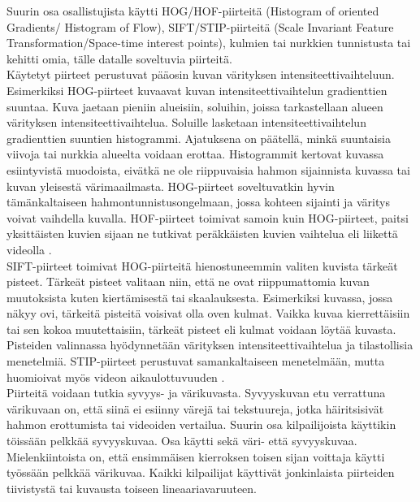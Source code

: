 Suurin osa osallistujista käytti HOG/HOF-piirteitä (Histogram of oriented Gradients/ Histogram of Flow), SIFT/STIP-piirteitä 
(Scale Invariant Feature Transformation/Space-time interest points), 
kulmien tai nurkkien tunnistusta tai kehitti omia, tälle datalle soveltuvia piirteitä.\citep {6239178}\\

Käytetyt piirteet perustuvat pääosin kuvan värityksen intensiteettivaihteluun.
Esimerkiksi HOG-piirteet kuvaavat kuvan intensiteettivaihtelun gradienttien suuntaa. Kuva jaetaan pieniin alueisiin, soluihin, 
joissa tarkastellaan alueen värityksen intensiteettivaihtelua. Soluille lasketaan intensiteettivaihtelun gradienttien suuntien histogrammi. 
Ajatuksena on päätellä, minkä suuntaisia viivoja tai nurkkia alueelta voidaan erottaa. \citep {1467360} Histogrammit kertovat kuvassa esiintyvistä
muodoista, eivätkä ne ole riippuvaisia hahmon sijainnista kuvassa tai kuvan yleisestä värimaailmasta.
HOG-piirteet soveltuvatkin hyvin tämänkaltaiseen hahmontunnistusongelmaan, jossa kohteen sijainti ja väritys voivat vaihdella kuvalla.
HOF-piirteet toimivat samoin kuin HOG-piirteet, paitsi yksittäisten kuvien sijaan ne tutkivat peräkkäisten kuvien vaihtelua eli liikettä videolla \citep{Pers20101369}.\\

SIFT-piirteet toimivat HOG-piirteitä hienostuneemmin valiten kuvista tärkeät pisteet. Tärkeät pisteet valitaan niin, että ne ovat riippumattomia
kuvan muutoksista kuten kiertämisestä tai skaalauksesta. Esimerkiksi kuvassa, jossa näkyy ovi, tärkeitä pisteitä voisivat olla oven kulmat.
Vaikka kuvaa kierrettäisiin tai sen kokoa muutettaisiin, tärkeät pisteet eli kulmat voidaan löytää kuvasta.
Pisteiden valinnassa hyödynnetään värityksen intensiteettivaihtelua ja tilastollisia menetelmiä.  \citep {790410}
STIP-piirteet perustuvat samankaltaiseen menetelmään, mutta huomioivat myös videon aikaulottuvuuden \citep{1238378}. \\

Piirteitä voidaan tutkia syvyys- ja värikuvasta. Syvyyskuvan etu verrattuna värikuvaan on, että siinä
ei esiinny värejä tai tekstuureja, jotka häiritsisivät hahmon erottumista tai videoiden vertailua.
Suurin osa kilpailijoista käyttikin töissään pelkkää syvyyskuvaa. Osa käytti sekä väri- että syvyyskuvaa. 
Mielenkiintoista on, että ensimmäisen kierroksen toisen sijan voittaja käytti työssään pelkkää värikuvaa. 
Kaikki kilpailijat käyttivät jonkinlaista piirteiden tiivistystä tai kuvausta toiseen lineaariavaruuteen. \citep {6239178}\\ 

